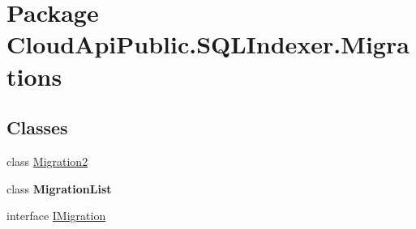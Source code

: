 \hypertarget{namespace_cloud_api_public_1_1_s_q_l_indexer_1_1_migrations}{\section{Package Cloud\-Api\-Public.\-S\-Q\-L\-Indexer.\-Migrations}
\label{namespace_cloud_api_public_1_1_s_q_l_indexer_1_1_migrations}
}
\subsection*{Classes}
\begin{DoxyCompactItemize}
\item 
class \hyperlink{class_cloud_api_public_1_1_s_q_l_indexer_1_1_migrations_1_1_migration2}{Migration2}
\item 
class {\bfseries Migration\-List}
\item 
interface \hyperlink{interface_cloud_api_public_1_1_s_q_l_indexer_1_1_migrations_1_1_i_migration}{I\-Migration}
\end{DoxyCompactItemize}
